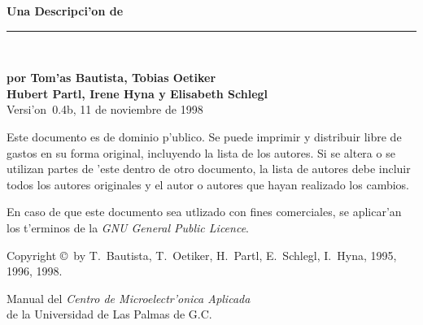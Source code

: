 \ifx\pdfoutput\undefined %
\else
{}
\fi
\newlength{\centeroffset}
\setlength{\centeroffset}{-0.5\oddsidemargin}
\addtolength{\centeroffset}{0.5\evensidemargin}
\thispagestyle{empty}
\noindent\hspace*{\centeroffset}\begin{minipage}{\textwidth}
\flushright
{\Huge\bfseries Una Descripci'on de\\ 
\LaTeXe
}
\noindent\rule[-1ex]{\textwidth}{5pt}\\[4.5ex]
\end{minipage}

\noindent\hspace*{\centeroffset}\begin{minipage}{\textwidth}
\flushright
{\bfseries 
por Tom'as Bautista, Tobias Oetiker\\
Hubert Partl, Irene Hyna y Elisabeth Schlegl\\[1.5ex]} 
Versi'on~0.4b, 11 de noviembre de 1998
\end{minipage}


\pagebreak
\begin{tiny} 
  Este documento es de dominio p'ublico. Se puede imprimir y
  distribuir libre de gastos en su forma original, incluyendo la lista
  de los autores. Si se altera o se utilizan partes de 'este dentro de
  otro documento, la lista de autores debe incluir todos los autores
  originales y el autor o autores que hayan realizado los cambios.

  En caso de que este documento sea utlizado con fines comerciales, se
  aplicar'an los t'erminos de la \textit{GNU General Public Licence}.\par
\end{tiny}

\vspace{3cm}
\noindent
Copyright \copyright\ by T.~Bautista, T.~Oetiker, H.~Partl,
E.~Schlegl, I.~Hyna, 1995, 1996, 1998.\\
\vspace{2cm}
\noindent
\vfill
\begin{center}
Manual del \emph{Centro de Microelectr'onica Aplicada} \\
de la Universidad de Las Palmas de G.C.
\end{center}


\endinput
